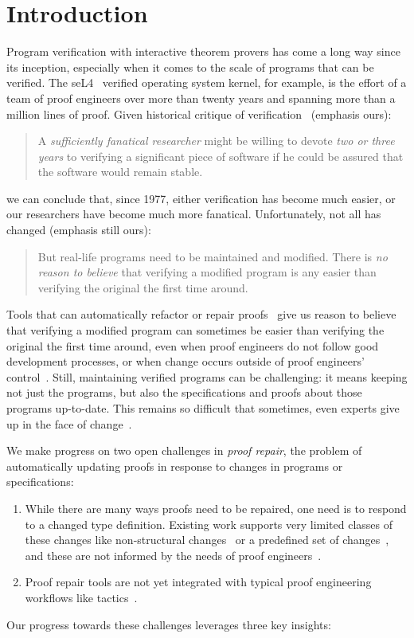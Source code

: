 \section{Introduction}

Program verification with interactive theorem provers has come a long way since its inception,
especially when it comes to the scale of programs that can be verified.
The seL4~\cite{Klein2009} verified operating system kernel, for example,
is the effort of a team of proof engineers over more than twenty years and spanning more than
a million lines of proof.
Given historical critique of verification~\cite{DeMillo1977} (emphasis ours):

\begin{quote}
A \textit{sufficiently fanatical researcher}
might be willing to devote \textit{two or 
three years} to verifying a significant 
piece of software if he could be 
assured that the software would remain stable.
\end{quote}
we can conclude that, since 1977, either verification has become much easier,
or our researchers have become much more fanatical. Unfortunately, not all has changed (emphasis still ours):

\begin{quote}
But real-life programs need to 
be maintained and modified. 
There is \textit{no reason to believe} that verifying a modified program is any 
easier than verifying the original the 
first time around.
\end{quote}
Tools that can automatically refactor or repair proofs~\cite{wibergh2019, WhitesidePhD, Dietrich2013, adams2015, Bourke12, Roe2016, robert2018, pumpkinpatch}
give us reason to believe that verifying a modified program can sometimes be easier than verifying the original the first time
around, even when proof engineers do not follow good development processes,
or when change occurs outside of proof engineers' control~\cite{PGL-045}.
Still, maintaining verified programs can be challenging: it means keeping not just the programs, but also the
specifications and proofs about those programs up-to-date.
This remains so difficult that sometimes, even experts give up in the face of change~\cite{replica}.

We make progress on two open challenges in \textit{proof repair}, the problem of automatically updating proofs in response
to changes in programs or specifications:

\begin{enumerate}
\item While there are many ways proofs need to be repaired, one need is to respond to a changed type definition.
Existing work supports very limited classes of these changes like non-structural changes~\cite{pumpkinpatch} or a predefined set
of changes~\cite{robert2018, wibergh2019}, and these are not informed by the needs of proof engineers~\cite{replica}.
\item Proof repair tools are not yet integrated with typical proof engineering workflows like tactics~\cite{PGL-045, pumpkinpatch, robert2018}.
\end{enumerate}
Our progress towards these challenges leverages three key insights:

